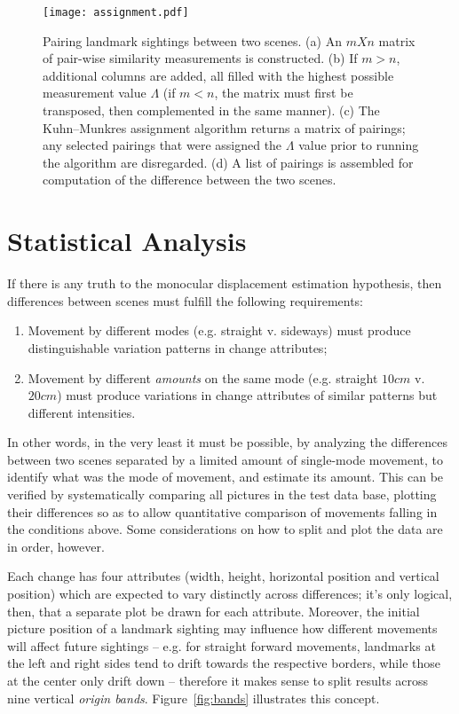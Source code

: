\documentclass[twocolumn, 9pt]{jsproceedings}
\begin{document}
\begin{figure}[h!]
\texttt{[image: assignment.pdf]}
\caption{Pairing landmark sightings between two scenes. (a) An \(m X n\) matrix of pair-wise similarity measurements is constructed. (b) If \(m > n\), additional columns are added, all filled with the highest possible measurement value \(\Lambda\) (if \(m < n\), the matrix must first be transposed, then complemented in the same manner). (c) The Kuhn–Munkres assignment algorithm returns a matrix of pairings; any selected pairings that were assigned the \(\Lambda\) value prior to running the algorithm are disregarded. (d) A list of pairings is assembled for computation of the difference between the two scenes.}
\label{fig:assignment}
\end{figure}

\section{Statistical Analysis}

If there is any truth to the monocular displacement estimation hypothesis, then differences between scenes must fulfill the following requirements:

\begin{enumerate}
\item Movement by different modes (e.g. straight v. sideways) must produce distinguishable variation patterns in change attributes;
\item Movement by different {\it amounts} on the same mode (e.g. straight \(10cm\) v. \(20cm\)) must produce variations in change attributes of similar patterns but different intensities.
\end{enumerate}

In other words, in the very least it must be possible, by analyzing the differences between two scenes separated by a limited amount of single-mode movement, to identify what was the mode of movement, and estimate its amount. This can be verified by systematically comparing all pictures in the test data base, plotting their differences so as to allow quantitative comparison of movements falling in the conditions above. Some considerations on how to split and plot the data are in order, however.

Each change has four attributes (width, height, horizontal position and vertical position) which are expected to vary distinctly across differences; it's only logical, then, that a separate plot be drawn for each attribute. Moreover, the initial picture position of a landmark sighting may influence how different movements will affect future sightings -- e.g. for straight forward movements, landmarks at the left and right sides tend to drift towards the respective borders, while those at the center only drift down -- therefore it makes sense to split results across nine vertical {\it origin bands}. Figure~\ref{fig:bands} illustrates this concept.
\end{document}
